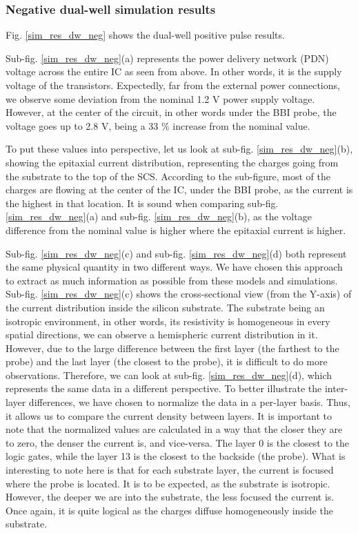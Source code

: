 	\subsubsection{Negative dual-well simulation results}
		Fig. \ref{sim_res_dw_neg} shows the dual-well positive pulse results.

		Sub-fig. \ref{sim_res_dw_neg}(a) represents the power delivery network (PDN) voltage across the entire IC as seen from above.
		In other words, it is the supply voltage of the transistors.
		Expectedly, far from the external power connections, we observe some deviation from the nominal 1.2 V power supply voltage.
		However, at the center of the circuit, in other words under the BBI probe, the voltage goes up to 2.8 V, being a 33 \% increase from the nominal value.

		To put these values into perspective, let us look at sub-fig. \ref{sim_res_dw_neg}(b), showing the epitaxial current distribution, representing the charges going from the substrate to the top of the SCS.
		According to the sub-figure, most of the charges are flowing at the center of the IC, under the BBI probe, as the current is the highest in that location.
		It is sound when comparing sub-fig. \ref{sim_res_dw_neg}(a) and sub-fig. \ref{sim_res_dw_neg}(b), as the voltage difference from the nominal value is higher where the epitaxial current is higher.

		Sub-fig. \ref{sim_res_dw_neg}(c) and sub-fig. \ref{sim_res_dw_neg}(d) both represent the same physical quantity in two different ways.
		We have chosen this approach to extract as much information as possible from these models and simulations.
		Sub-fig. \ref{sim_res_dw_neg}(c) shows the cross-sectional view (from the Y-axis) of the current distribution inside the silicon substrate.
		The substrate being an isotropic environment, in other words, its resistivity is homogeneous in every spatial directions, we can observe a hemispheric current distribution in it.
		However, due to the large difference between the first layer (the farthest to the probe) and the last layer (the closest to the probe), it is difficult to do more observations.
		Therefore, we can look at sub-fig. \ref{sim_res_dw_neg}(d), which represents the same data in a different perspective.
		To better illustrate the inter-layer differences, we have chosen to normalize the data in a per-layer basis.
		Thus, it allows us to compare the current density between layers.
		It is important to note that the normalized values are calculated in a way that the closer they are to zero, the denser the current is, and vice-versa.
		The layer 0 is the closest to the logic gates, while the layer 13 is the closest to the backside (the probe).
		What is interesting to note here is that for each substrate layer, the current is focused where the probe is located.
		It is to be expected, as the substrate is isotropic.
		However, the deeper we are into the substrate, the less focused the current is.
		Once again, it is quite logical as the charges diffuse homogeneously inside the substrate.

